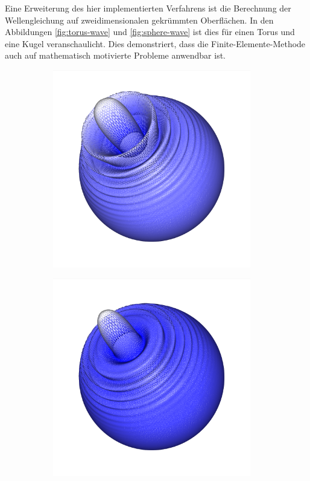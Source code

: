 \documentclass[crop=false]{standalone}
\begin{document}
    Eine Erweiterung des hier implementierten Verfahrens ist die Berechnung der Wellengleichung auf zweidimensionalen gekrümmten Oberflächen.
    In den Abbildungen \ref{fig:torus-wave} und \ref{fig:sphere-wave} ist dies für einen Torus und eine Kugel veranschaulicht.
    Dies demonstriert, dass die Finite-Elemente-Methode auch auf mathematisch motivierte Probleme anwendbar ist.

    \begin{figure}
      \center
      \begin{subfigure}[b]{0.24\textwidth}
        \center
        \includegraphics[trim={2.12cm 2.33cm 2.2cm 0cm},clip,width=0.95\textwidth]{images/sphere_wave_0.png}
        \caption{}
      \end{subfigure}
      \begin{subfigure}[b]{0.24\textwidth}
        \center
        \includegraphics[trim={2.12cm 2.33cm 2.2cm 0cm},clip,width=0.95\textwidth]{images/sphere_wave_1.png}

\end{subfigure}
\end{figure}
\end{document}
